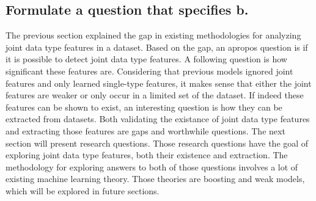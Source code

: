 \subsection{Formulate a question that specifies b.}

The previous section explained the gap in existing methodologies for analyzing joint data type features in a dataset.  Based on the gap, an apropos question is if it is possible to detect joint data type features.  A following question is how significant these features are.  Considering that previous models ignored joint features and only learned single-type features, it makes sense that either the joint features are weaker or only occur in a limited set of the dataset. If indeed these features can be shown to exist, an interesting question is how they can be extracted from datasets.  Both validating the existance of joint data type features and extracting those features are gaps and worthwhile questions.  The next section will present research questions.  Those research questions have the goal of exploring joint data type features, both their existence and extraction.  The methodology for exploring answers to both of those questions involves a lot of existing machine learning theory.  Those theories are boosting and weak models, which will be explored in future sections.



